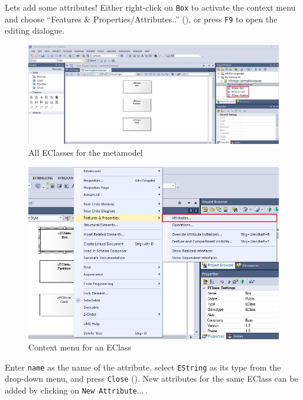 \begin{stepbystep}
\item Lets add some attributes! Either right-click on \texttt{Box} to activate the context menu and choose ``Features \&
Properties/Attributes..'' (), or press \texttt{F9} to open the editing dialogue.

\begin{figure}[htbp]
	\centering
  \includegraphics[width=\textwidth]{../../org.moflon.doc.handbook.02_leitnersLearningBox/2_staticSemantics/2_definingClasses/dcVisImages/ea_createPartitionCard}
	\caption{All EClasses for the metamodel}
	\label{ea:all_eclasses}
\end{figure}

\begin{figure}[htbp]
	\centering
  \includegraphics[width=\textwidth]{../../org.moflon.doc.handbook.02_leitnersLearningBox/2_staticSemantics/2_definingClasses/dcVisImages/ea_contextAddAttribute}
	\caption{Context menu for an EClass}
	\label{ea:attribute}
\end{figure}
\FloatBarrier

\item Enter \texttt{name} as the name of the attribute, select \texttt{EString} as its type from the drop-down menu, and press
\texttt{Close} (). New attributes for the same EClass can be added by clicking on \texttt{New Attribute}...\,.


\end{stepbystep}
